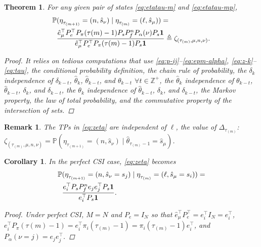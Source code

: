 \documentclass[journal,twoside,web]{ieeecolor}
\newtheorem{theorem}{Theorem}
\newtheorem{corollary}{Corollary}[theorem]
\newtheorem{remark}{Remark}
\begin{document}
\begin{theorem}\label{theorem:eta-probability}
    For any given pair of states \eqref{eq:etatau-m} and \eqref{eq:etatau-mp}, 
    \begin{align}\label{eq:zeta}
    \begin{aligned}
        \text{\small $\mathbb{P}$}&\text{\small $(\eta_{\tau_{(m+1)}}^{} = (n,\hat{s}_{\nu}) \mid \eta_{\tau_{(m)}}^{} = (\ell,\hat{s}_{\mu})) =$} \\
        & \text{\small $\frac{\hat{e}_{\mu}^{\top} P_{e}^{\top} P_{\pi}(\tau{(m)}-1) P_{s} P_{f}^{n} P_{\alpha}(\nu) P_{s} \mathbf{1}}{\hat{e}_{\mu}^{\top} P_{e}^{\top} P_{\pi}(\tau{(m)}-1) P_{s}\mathbf{1}} \triangleq \zeta_{(\tau_{(m)},\mu,n,\nu)}.$}
    \end{aligned}        
    \end{align}
\begin{proof}
    It relies on tedious computations that use \eqref{eq:p-ij}–\eqref{eq:epm-alpha}, \eqref{eq:z-k}–\eqref{eq:tau}, the conditional probability definition, the chain rule of probability, the $\delta_{k}$ independence of $\delta_{k-t}$, $\hat{\theta}_{k}$, $\hat{\theta}_{k-t}$, and $\theta_{k-t}$ $\forall t \in \mathbb{Z}^{+}$, the $\hat{\theta}_{k}$ independence of $\theta_{k-t}$, $\hat{\theta}_{k-t}$, $\delta_k$, and $\delta_{k-t}$,
    the $\theta_{k}$ independence of $\hat{\theta}_{k-t}$, $\delta_{k}$, and $\delta_{k-t}$,
    the Markov property, the law of total probability, 
    and the commutative property of the intersection of sets.
\end{proof}
\end{theorem}
\begin{remark}\label{rem:zeta-l-independence}
The TPs in \eqref{eq:zeta} are independent of $\ell$, the value of $\mathit{\Delta}_{\tau_{(m)}}$: $\zeta_{(\tau_{(m)},\mu,n,\nu)} = \mathbb{P}(\eta_{\tau_{(m+1)}}^{} \!= (n,\hat{s}_{\nu}) \mid \hat{\theta}_{\tau_{(m)}-1} \!= \hat{s}_{\mu})$.
\end{remark}
\begin{corollary}\label{corollary:eta}
In the \emph{perfect CSI} case, \eqref{eq:zeta} becomes
\begin{align}\label{eq:zeta-perfect-csi}
    \begin{aligned}
        \text{\small $\mathbb{P}$}&\text{\small $(\eta_{\tau_{(m+1)}}^{} = (n,\hat{s}_{\nu}=s_j) \mid \eta_{\tau_{(m)}}^{} = (\ell,\hat{s}_{\mu}=s_i)) =$} \\
        &\text{\small $\frac{e_{i}^{\top} P_{s} P_{f}^{n} e_{j}e_{j}^{\top} P_{s} \mathbf{1}}{e_{i}^{\top} P_{s}\mathbf{1}}.$}
    \end{aligned}
\end{align}
\begin{proof}
    Under perfect CSI, $M=N$ and $P_e = I_{N}$ so that $\hat{e}_{\mu}^{\top} P_{e}^{\top} = e_{i}^{\top} I_{N} = e_{i}^{\top}$, $e_{i}^{\top} P_{\pi}(\tau{(m)}-1)=e_{i}^{\top}\pi_{i}(\tau_{(m)}-1)=\pi_{i}(\tau_{(m)}-1)e_{i}^{\top}$, and $P_{\alpha}(\nu=j)=e_{j}e_{j}^{\top}$.
\end{proof}
\end{corollary}
\end{document}
